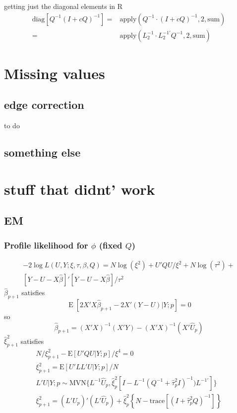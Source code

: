 \documentclass[12pt]{article}
\DeclareMathOperator{\E}{E}
\begin{document}
getting just the diagonal elements in R
\begin{align*}
\text{diag}\left[Q^{-1} ( I + c Q  )^{-1}\right]	= &
\text{apply}(Q^{-1} \cdot
( I + c Q  )^{-1}, 2,\text{sum})\\
= & \text{apply}(L_2^{-1}\cdot L_2^{-1\prime}Q^{-1},2,\text{sum})
\end{align*}


\section*{Missing values}

\subsection{edge correction}
to do

\subsection{something else}

\appendix

\section{stuff that didnt' work}


\subsection{EM}

\subsubsection{Profile likelihood for $\phi$ (fixed $Q$)}
\begin{multline*}
-2 \log L(U,Y;\xi,\tau,\beta,Q) =
	N\log(\xi^2) + U'Q U/\xi^2 +
	N\log(\tau^2) +\\
	[Y-U-X\hat\beta]'[Y-U-X\hat\beta]/\tau^2
	\end{multline*}
$\hat\beta_{p+1}$ satisfies
\[
\E[ 2  X' X \hat\beta_{p+1} - 2 X'(Y - U) |Y ; p] = 0
 \]
 so
\[
 \hat\beta_{p+1} = (X'X)^{-1}(X'Y) - (X'X)^{-1}(X'\hat U_p)
\]
$\hat\xi^2_{p+1}$ satisfies
\begin{gather*}
N/\xi^2_{p+1} - \text{E}[ U'Q U |Y; p ]/\xi^4 = 0\\
\xi^2_{p+1} = \text{E}[ U'L L' U |Y; p ]/N\\
L'U|Y;p \sim  \text{MVN}\{
	L^{-1}\hat U_p,
\hat\xi_p^2[I - L^{-1}( Q^{-1} + \hat\tau_p^2 I  )^{-1}) L^{-1\prime}] \}\\
\xi^2_{p+1} = (L' \hat U_p )'(L'\hat U_p) + \hat\xi_p^2\left\{N-
\text{trace}\left[(I + \hat\tau_p^2 Q  )^{-1} \right]\right\}
\end{gather*}
\end{document}
